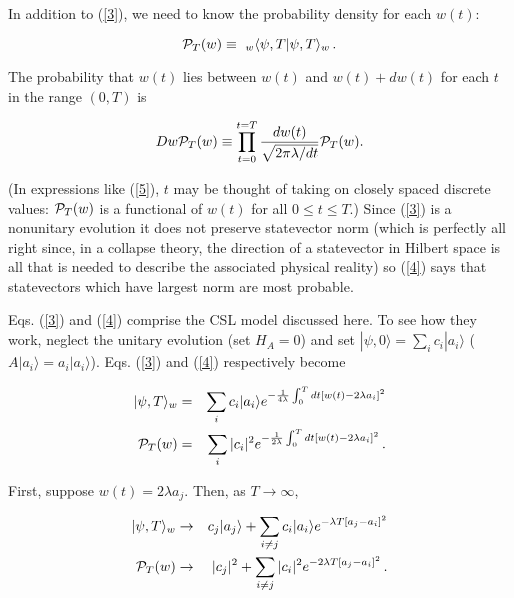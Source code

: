 \documentclass{article}
\begin{document}
	In addition to (\ref{3}), we need to know the 
probability density for each $w(t)$: 

\begin{equation}\label{4}
	{\cal P}_{T}(w)\equiv
	\ _{w}\langle\psi,T|\psi,T\rangle_{w}\, .
\end{equation}

\noindent The probability that $w(t)$ lies between $w(t)$ and $w(t)+dw(t)$ 
for each $t$ in the range $(0,T)$ is 

\begin{equation}\label{5}
	Dw{\cal P}_{T}(w)\equiv
	\prod_{t=0}^{t=T}\frac{dw(t)}{\sqrt{2\pi\lambda/dt}}{\cal P}_{T}(w).
\end{equation}

\noindent (In expressions like (\ref{5}), $t$ may be thought of taking on closely 
spaced discrete values: ${\cal P}_{T}(w)$ is a functional of $w(t)$ for all $0\leq t\leq T$.)  
Since (\ref{3}) is a nonunitary evolution it does not 
preserve statevector norm (which is perfectly all right since, in a collapse theory, 
the direction of a statevector in Hilbert space is all that is needed to 
describe the associated physical reality) so (\ref{4}) says that 
statevectors which have largest norm are most probable.  

	Eqs. (\ref{3}) and (\ref{4}) comprise the CSL model discussed here.  
To see how they work, neglect the unitary evolution (set $H_{A}=0$) and 
set $|\psi,0\rangle=\sum_{i}c_{i}|a_{i}\rangle$ 
($A|a_{i}\rangle=a_{i}|a_{i}\rangle$).  Eqs. (\ref{3}) and (\ref{4}) respectively become 

\begin{eqnarray*}
	|\psi,T\rangle_{w}&
	=&\sum_{i}c_{i}|a_{i}\rangle e^{-\frac{1}{4\lambda}\int_{0}^{T}
 dt[w(t)-2\lambda a_{i}]^{2}}\\
	{\cal P}_{T}(w)&
	=&\sum_{i}|c_{i}|^{2}e^{-\frac{1}{2\lambda}\int_{0}^{T}
 dt[w(t)-2\lambda a_{i}]^{2}}\, .
\end{eqnarray*}

\noindent First, suppose $w(t)=2\lambda a_{j}$.  Then, as $T\rightarrow\infty$,

\begin{eqnarray*}
	|\psi,T\rangle_{w}&\rightarrow &c_{j}|a_{j}\rangle +
	\sum_{i\neq j}c_{i}|a_{i}\rangle e^{-\lambda T [a_{j}-a_{i}]^{2}}\\
	{\cal P}_{T}(w)&\rightarrow &|c_{j}|^{2}+
	\sum_{i\neq j}|c_{i}|^{2} e^{-2\lambda T [a_{j}-a_{i}]^{2}}\, . 
\end{eqnarray*}
\end{document}
